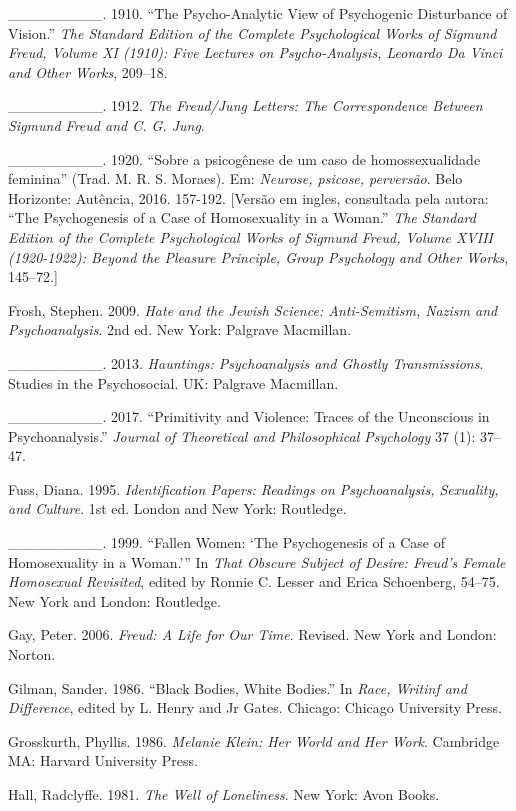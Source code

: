\_\_\_\_\_\_\_\_\_. 1910. ``The Psycho-Analytic View of Psychogenic Disturbance
of Vision.'' \emph{The Standard Edition of the Complete Psychological
Works of Sigmund Freud, Volume XI (1910): Five Lectures on
Psycho-Analysis, Leonardo Da Vinci and Other Works}, 209--18.

\_\_\_\_\_\_\_\_\_. 1912. \emph{The Freud/Jung Letters: The Correspondence
Between Sigmund Freud and C. G. Jung}.

\_\_\_\_\_\_\_\_\_. 1920. ``Sobre a psicogênese de um caso de homossexualidade
feminina'' (Trad. M. R. S. Moraes). Em: \emph{Neurose, psicose,
perversão}. Belo Horizonte: Autência, 2016. 157-192. {[}Versão em
ingles, consultada pela autora: ``The Psychogenesis of a Case of
Homosexuality in a Woman.'' \emph{The Standard Edition of the Complete
Psychological Works of Sigmund Freud, Volume XVIII (1920-1922): Beyond
the Pleasure Principle, Group Psychology and Other Works}, 145--72.{]}

Frosh, Stephen. 2009. \emph{Hate and the Jewish Science: Anti-Semitism,
Nazism and Psychoanalysis}. 2nd ed. New York: Palgrave Macmillan.

\_\_\_\_\_\_\_\_\_. 2013. \emph{Hauntings: Psychoanalysis and Ghostly
Transmissions}. Studies in the Psychosocial. UK: Palgrave Macmillan.

\_\_\_\_\_\_\_\_\_. 2017. ``Primitivity and Violence: Traces of the Unconscious
in Psychoanalysis.'' \emph{Journal of Theoretical and Philosophical
Psychology} 37 (1): 37--47.

Fuss, Diana. 1995. \emph{Identification Papers: Readings on
Psychoanalysis, Sexuality, and Culture}. 1st ed. London and New York:
Routledge.

\_\_\_\_\_\_\_\_\_. 1999. ``Fallen Women: `The Psychogenesis of a Case of
Homosexuality in a Woman.''' In \emph{That Obscure Subject of Desire:
Freud's Female Homosexual Revisited}, edited by Ronnie C. Lesser and
Erica Schoenberg, 54--75. New York and London: Routledge.

Gay, Peter. 2006. \emph{Freud: A Life for Our Time}. Revised. New York
and London: Norton.

Gilman, Sander. 1986. ``Black Bodies, White Bodies.'' In \emph{Race,
Writinf and Difference}, edited by L. Henry and Jr Gates. Chicago:
Chicago University Press.

Grosskurth, Phyllis. 1986. \emph{Melanie Klein: Her World and Her Work}.
Cambridge MA: Harvard University Press.

Hall, Radclyffe. 1981. \emph{The Well of Loneliness}. New York: Avon
Books.

